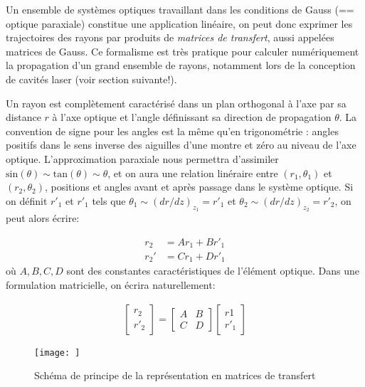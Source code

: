 \documentclass[a4paper]{article}
\begin{document}
Un ensemble de systèmes optiques travaillant dans les conditions de Gauss (== optique paraxiale) constitue une application linéaire, on peut donc exprimer les trajectoires des rayons par produits de \textit{matrices de transfert}, aussi appelées matrices de Gauss. Ce formalisme est  très pratique pour calculer numériquement la propagation d'un grand ensemble de rayons, notamment lors de la conception de cavités laser (voir section suivante!).

Un rayon est complètement caractérisé dans un plan orthogonal à l'axe par sa distance $r$ à l'axe optique et l'angle définissant sa direction de propagation $\theta$. La convention de signe pour les angles est la même qu'en trigonométrie : angles positifs dans le sens inverse des aiguilles d'une montre et zéro au niveau de l'axe optique. 
L'approximation paraxiale nous permettra d'assimiler $\mathrm{sin}(\theta)\sim\mathrm{tan}(\theta)\sim\theta$, et on aura une relation linéraire entre $\left(r_1, \theta_1\right)$ et $\left(r_2, \theta_2\right)$, positions et angles avant et après passage dans le système optique. Si on définit $r'_1$ et $r'_1$ tels que $\theta_1 \sim (dr/dz)_z_1 = r'_1$ et $\theta_2 \sim (dr/dz)_z_2 = r'_2$, on peut alors écrire: 

\begin{align} 
r_2 &=  Ar_1 + Br'_1 \\ 
r_2' &=  Cr_1 + Dr'_1
\end{align}
où $A, B, C, D$ sont des constantes caractéristiques de l'élément optique. Dans une formulation matricielle, on écrira naturellement:

\begin{gather}
 \begin{bmatrix} r_2 \\ r'_2 \end{bmatrix}
 =
  \begin{bmatrix}
   A & B \\
   C & D 
   \end{bmatrix}
   \begin{bmatrix} r1 \\ r'_1 \end{bmatrix}
\end{gather}

\begin{figure}[!htbp]
\label{fig:matrix}
\begin{center}
\texttt{[image: ]}
\end{center}
\caption{Schéma de principe de la représentation en matrices de transfert}
\end{figure}
\end{document}
